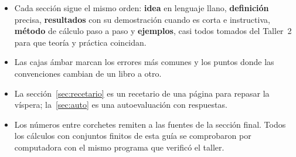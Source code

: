 \documentclass[11pt]{article}
\begin{document}
\begin{metodo}
\begin{itemize}
\item Cada sección sigue el mismo orden: \textbf{idea} en lenguaje llano, \textbf{definición} precisa, \textbf{resultados}
con su demostración cuando es corta e instructiva, \textbf{método} de cálculo paso a paso y \textbf{ejemplos}, casi todos
tomados del Taller~2 para que teoría y práctica coincidan.
\item Las cajas ámbar marcan los errores más comunes y los puntos donde las convenciones cambian de un libro a otro.
\item La sección~\ref{sec:recetario} es un recetario de una página para repasar la víspera; la~\ref{sec:auto} es una
autoevaluación con respuestas.
\item Los números entre corchetes remiten a las fuentes de la sección final. Todos los cálculos con conjuntos finitos
de esta guía se comprobaron por computadora con el mismo programa que verificó el taller.
\end{itemize}
\end{metodo}
\newpage
\setcounter{tocdepth}{2}
{\small\tableofcontents}
\newpage






\end{document}
